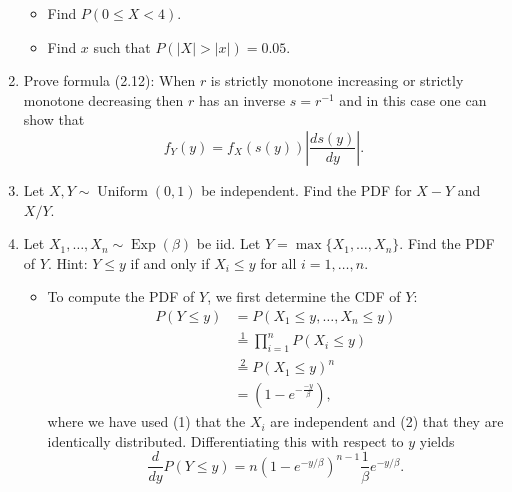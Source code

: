 \documentclass{article}
\begin{document}
\begin{enumerate}
\begin{itemize}
			\item Find $P(0 \leq X < 4)$.
			\item Find $x$ such that $P(|X| > |x|) = 0.05$.
		\end{itemize}
	\item Prove formula (2.12): When $r$ is strictly monotone increasing or strictly monotone decreasing then $r$ has an inverse $s = r^{-1}$ and in this case one can show that
	$$
	f_Y(y) = f_X(s(y)) \left|\frac{ds(y)}{dy}\right|.
	$$
	\item Let $X, Y \sim \operatorname{Uniform}(0, 1)$ be independent. Find the PDF for $X - Y$ and $X / Y$.
	\item Let $X_1, \dots, X_n \sim \operatorname{Exp}(\beta)$ be iid. Let $Y = \max\{X_1, \dots, X_n\}$. Find the PDF of $Y$. Hint: $Y \leq y$ if and only if $X_i \leq y$ for all $i = 1, \dots, n$.
		\begin{itemize}
			\item To compute the PDF of $Y$, we first determine the CDF of $Y$:
			$$
			\begin{aligned}
			P(Y \leq y) &= P(X_1 \leq y, \dots, X_n \leq y) \\
			&\overset{1}{=} \prod_{i = 1}^n P(X_i \leq y) \\
			&\overset{2}{=} P(X_1 \leq y)^n \\
			&= \left(1 - e^{- \frac{- y}{\beta}}\right),
			\end{aligned}
			$$
			where we have used (1) that the $X_i$ are independent and (2) that they are identically distributed. Differentiating this with respect to $y$ yields
			$$
			\frac{d}{dy} P(Y \leq y) = n (1 - e^{- y / \beta})^{n - 1} \frac{1}{\beta} e^{- y / \beta}.
			$$
		\end{itemize}
\end{enumerate}
\end{document}
